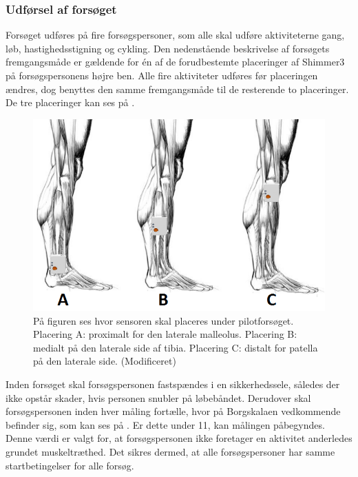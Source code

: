\subsubsection{Udførsel af forsøget}
Forsøget udføres på fire forsøgspersoner, som alle skal udføre aktiviteterne gang, løb, hastighedsstigning og cykling. Den nedenstående beskrivelse af forsøgets fremgangsmåde er gældende for én af de forudbestemte placeringer af Shimmer3 på forsøgspersonens højre ben. Alle fire aktiviteter udføres før placeringen ændres, dog benyttes den samme fremgangsmåde til de resterende to placeringer. De tre placeringer kan ses på .
\begin{figure}[H]
	\centering
	\includegraphics[scale=0.55]{figures/qBilag/Sensor_placering2.png}
	\caption{På figuren ses hvor sensoren skal placeres under pilotforsøget. Placering A: proximalt for den laterale malleolus. Placering B: medialt på den laterale side af tibia. Placering C: distalt for patella på den laterale side. \citep{Perna2016,Shimmer2016} (Modificeret)}
	\label{fig:sensor_placering}
\end{figure}
Inden forsøget skal forsøgspersonen fastspændes i en sikkerhedssele, således der ikke opstår skader, hvis personen snubler på løbebåndet. Derudover skal forsøgspersonen inden hver måling fortælle, hvor på Borgskalaen vedkommende befinder sig, som kan ses på . Er dette under 11, kan målingen påbegyndes. Denne værdi er valgt for, at forsøgspersonen ikke foretager en aktivitet anderledes grundet muskeltræthed. Det sikres dermed, at alle forsøgspersoner har samme startbetingelser for alle forsøg. 
